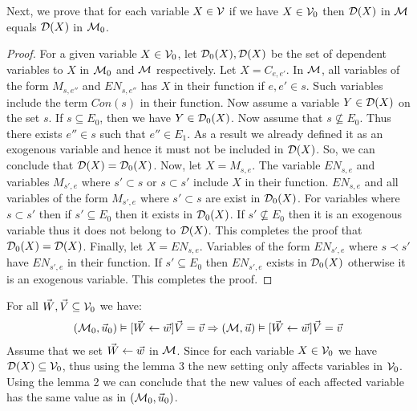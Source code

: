 \begin{lemma}
    Next, we prove that for each variable $X \in \mathcal{V}$ if we have
    $X \in \mathcal{V}_0$ then $\mathcal{D}(X)$ in $\mathcal{M}$ equals $\mathcal{D}(X)$ in $\mathcal{M}_0$.
\end{lemma}
\begin{proof}
    For a given variable $X \in \mathcal{V}_0$, let $\mathcal{D}_0(X),\mathcal{D}(X)$
    be the set of dependent variables to $X$ in $\mathcal{M}_0$ and $\mathcal{M}$ respectively.
    Let $X = C_{e,e'}$.
    In $\mathcal{M}$, all variables of the form $M_{s,e''}$ and $EN_{s,e''}$ has
    $X$ in their function if $e,e' \in s$.
    Such variables include the term $Con(s)$ in their function.
    Now assume a variable $Y \in \mathcal{D}(X)$ on the set $s$.
    If $s \subseteq E_0$, then we have $Y \in \mathcal{D}_0(X)$.
    Now assume that $s \not \subseteq E_0$.
    Thus there exists $e'' \in s$ such that $e'' \in E_1$.
    As a result we already defined it as an exogenous variable and hence
    it must not be included in $\mathcal{D}(X)$.
    So, we can conclude that $\mathcal{D}(X) = \mathcal{D}_0(X)$.
    Now, let $X = M_{s,e}$.
    The variable $EN_{s,e}$ and variables $M_{s',e}$ where
    $s' \subset s$ or $s \subset s'$ include $X$ in their function.
    $EN_{s,e}$ and all variables of the form $M_{s',e}$ where
    $s' \subset s$ are exist in $\mathcal{D}_0(X)$.
    For variables where $s \subset s'$ then if $s' \subseteq E_0$ then
    it exists in $\mathcal{D}_0(X)$.
    If $s' \not \subseteq E_0$ then it is an exogenous variable thus it does
    not belong to $\mathcal{D}(X)$.
    This completes the proof that $\mathcal{D}_0(X) = \mathcal{D}(X)$.
    Finally, let $X = EN_{s,e}$.
    Variables of the form $EN_{s',e}$ where $s \prec s'$ have $EN_{s',e}$
    in their function.
    If $s' \subseteq E_0$ then $EN_{s',e}$ exists in $\mathcal{D}_0(X)$
    otherwise it is an exogenous variable.
    This completes the proof.


\end{proof}

\begin{lemma}
    For all $\vec W, \vec V \subseteq \mathcal{V}_0$ we have:
    \begin{align*}
        (\mathcal{M}_0,\vec u_0) \vDash [\vec W \leftarrow \vec w]\vec V = \vec v
        \Rightarrow (\mathcal{M},\vec u) \vDash [\vec W \leftarrow \vec w] \vec V = \vec v
    \end{align*}
    Assume that we set $\vec W \leftarrow \vec w$ in $\mathcal{M}$.
    Since for each variable $X \in \mathcal{V}_0$ we have
    $\mathcal{D}(X) \subseteq \mathcal{V}_0$, thus using the lemma 3 the new setting
    only affects variables in $\mathcal{V}_0$.
    Using the lemma 2 we can conclude that the new values of each affected
    variable has the same value as in $(\mathcal{M}_0,\vec u_0)$.
\end{lemma}


